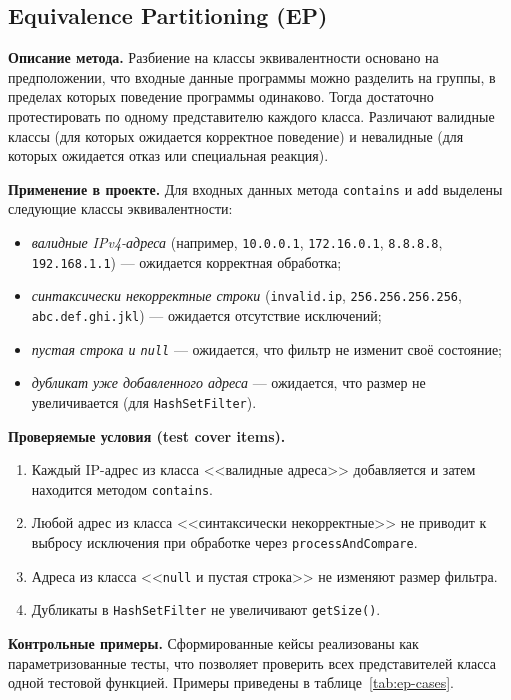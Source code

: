 \subsection{Equivalence Partitioning (EP)} \label{ch3:sec1:ep}

\textbf{Описание метода.} Разбиение на классы эквивалентности основано на предположении, что входные данные программы можно разделить на группы, в пределах которых поведение программы одинаково. Тогда достаточно протестировать по одному представителю каждого класса. Различают валидные классы (для которых ожидается корректное поведение) и невалидные (для которых ожидается отказ или специальная реакция).

\textbf{Применение в проекте.} Для входных данных метода \texttt{contains} и \texttt{add} выделены следующие классы эквивалентности:
\begin{itemize}
    \item \textit{валидные IPv4-адреса} (например, \texttt{10.0.0.1}, \texttt{172.16.0.1}, \texttt{8.8.8.8}, \texttt{192.168.1.1}) --- ожидается корректная обработка;
    \item \textit{синтаксически некорректные строки} (\texttt{invalid.ip}, \texttt{256.256.256.256}, \texttt{abc.def.ghi.jkl}) --- ожидается отсутствие исключений;
    \item \textit{пустая строка и \texttt{null}} --- ожидается, что фильтр не изменит своё состояние;
    \item \textit{дубликат уже добавленного адреса} --- ожидается, что размер не увеличивается (для \texttt{HashSetFilter}).
\end{itemize}

\textbf{Проверяемые условия (test cover items).}
\begin{enumerate}
    \item Каждый IP-адрес из класса <<валидные адреса>> добавляется и затем находится методом \texttt{contains}.
    \item Любой адрес из класса <<синтаксически некорректные>> не приводит к выбросу исключения при обработке через \texttt{processAndCompare}.
    \item Адреса из класса <<\texttt{null} и пустая строка>> не изменяют размер фильтра.
    \item Дубликаты в \texttt{HashSetFilter} не увеличивают \texttt{getSize()}.
\end{enumerate}

\textbf{Контрольные примеры.} Сформированные кейсы реализованы как параметризованные тесты, что позволяет проверить всех представителей класса одной тестовой функцией. Примеры приведены в таблице~\ref{tab:ep-cases}.

